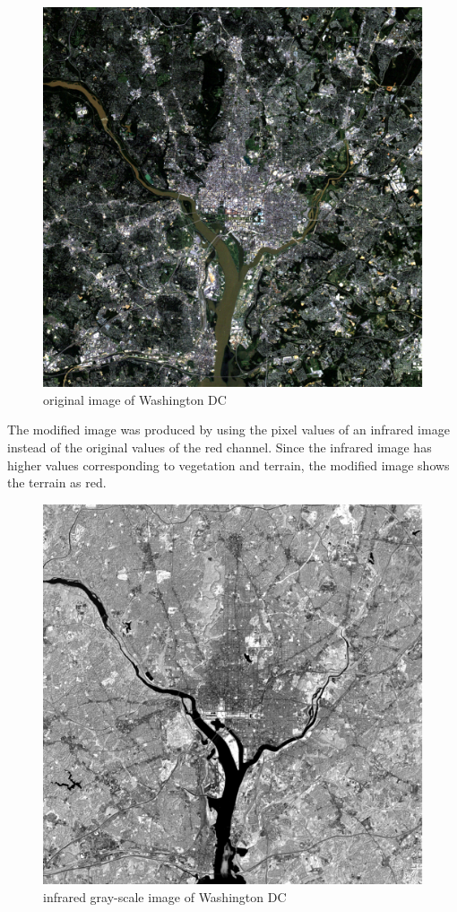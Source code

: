 \documentclass{article}
\begin{document}
	\begin{figure}[H]
		\includegraphics[width=\linewidth]{6.17/partA/washingtonDCcolor.png}
		\caption{original image of Washington DC}
	\end{figure}
	
	The modified image was produced by using the pixel values of an infrared image instead of the original values of the red channel. Since the infrared image has higher values corresponding to vegetation and terrain, the modified image shows the terrain as red.
	
	\begin{figure}[H]
		\includegraphics[width=\linewidth]{6.17/partA/infra.png}
		\caption{infrared gray-scale image of Washington DC}
	\end{figure}
	
\end{document}
